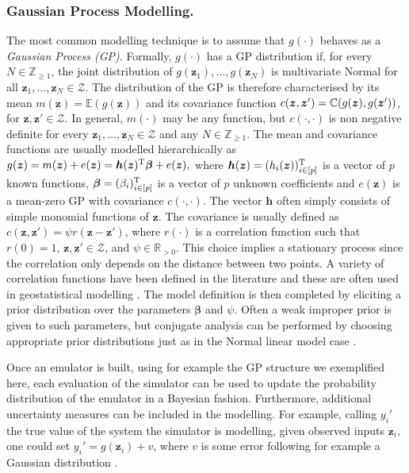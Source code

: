 \subsubsection{Gaussian Process Modelling.}
The most common modelling technique is to assume that $g(\cdot)$ behaves as a \textit{Gaussian Process (GP)}. Formally, $g(\cdot)$ has a GP distribution if, for every $N\in\mathbb{Z}_{\geq 1}$, the joint distribution of $g(\bm{z}_1),\dots,g(\bm{z}_N)$ is multivariate Normal for all $\bm{z}_1,\dots,\bm{z}_N\in\bm{\mathcal{Z}}$. The distribution of the GP is therefore characterised by its mean $m(\bm{z})=\mathbb{E}(g(\bm{z}))$ and its covariance function $c(\bm{z},\bm{z}')=\mathbb{C}(g(\bm{z}),g(\bm{z}'))$, for $\bm{z},\bm{z}'\in\bm{\mathcal{Z}}$. In general, $m(\cdot)$ may be any function, but $c(\cdot,\cdot)$ is non negative definite for every $\bm{z}_1,\dots,\bm{z}_N\in\bm{\mathcal{Z}}$ and any $N\in\mathbb{Z}_{\geq 1}$. The mean and covariance functions are usually modelled hierarchically as $
g(\bm{z})=m(\bm{z})+e(\bm{z})=\bm{h}(\bm{z})^{\textnormal{T}}\bm{\beta}+e(\bm{z}),$
where $\bm{h}(\bm{z})=(h_i(\bm{z}))_{i\in[p]}^{\textnormal{T}}$ is a vector of $p$ known functions, $\bm{\beta}=(\beta_i)_{i\in[p]}^{\textnormal{T}}$ is a vector of $p$ unknown coefficients and $e(\bm{z})$ is a mean-zero GP  with covariance $c(\cdot,\cdot)$. The vector $\bm{h}$ often simply consists of simple monomial functions of $\bm{z}$. The covariance is usually defined as $c(\bm{z},\bm{z}')=\psi r(\bm{z}-\bm{z}')$, where $r(\cdot)$ is a correlation function such that $r(0)=1$, $\bm{z},\bm{z}'\in\bm{\mathcal{Z}}$, and $\psi\in\mathbb{R}_{>0}$. This choice implies a stationary process since the correlation only depends on the distance between two points. A variety of correlation functions have been defined in the literature and these are often used in geostatistical modelling \citep[see e.g.][]{Diggle2007}. The model definition is then completed by eliciting a prior distribution over the parameters $\bm{\beta}$ and $\psi$. Often a weak improper prior is given to such parameters, but conjugate analysis can be performed by choosing appropriate prior distributions just as in the Normal linear model case \citep[see e.g.][]{Haylock1996}. 

Once an emulator is built, using for example the GP structure we exemplified here, each evaluation of the simulator can be used to update the  probability distribution of the emulator in a Bayesian fashion. Furthermore, additional uncertainty measures can be included in the modelling. For example, calling $y_i'$ the true value of the system the simulator is modelling, given observed inputs $\bm{z}_i$, one could set $y_i'=g(\bm{z}_i)+v$, where $v$ is some error following for example a Gaussian distribution \citep[see][for more comments on these modelling techniques]{Kennedy2000}.

